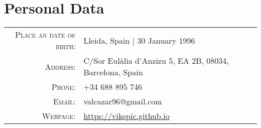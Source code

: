 \section{Personal Data}
\begin{center}
\begin{tabular}{ r l }
	\textsc{Place an date of birth:} 	& Lleida, Spain | 30 January 1996 	\\
	\textsc{Address:}			& C/Sor Eulàlia d'Anzizu 5, EA 2B, 08034, Barcelona, Spain \\
	\textsc{Phone:}				& +34 688 895 746 			\\
	\textsc{Email:}				& valcazar96@gmail.com 			\\
	\textsc{Webpage:}			& \url{https://vikepic.github.io}			\\
\end{tabular}
\end{center}
